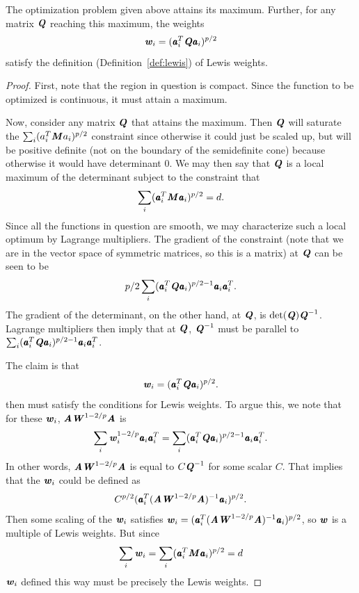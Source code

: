 \begin{lemma}
The optimization problem given above attains its maximum.
Further, for any matrix $\boldsymbol{\mathit{Q}}$ reaching this maximum, the weights
\begin{equation*}
\boldsymbol{\mathit{w}}_i = (\pmb{\mathit{a}}_i^T \boldsymbol{\mathit{Q}} \pmb{\mathit{a}}_i)^{p/2}
\end{equation*}
satisfy the definition (Definition~\ref{def:lewis}) of Lewis weights.
\end{lemma}
\begin{proof}
First, note that the region in question is compact.  Since the function to be
optimized is continuous, it must attain a maximum.

Now, consider any matrix $\boldsymbol{\mathit{Q}}$ that attains the maximum.
Then $\boldsymbol{\mathit{Q}}$ will saturate the $\sum_i (a_i^T \boldsymbol{\mathit{M}} a_i)^{p/2}$ constraint since otherwise
it could just be scaled up, but will be positive definite (not on the boundary of
the semidefinite cone) because otherwise it would have determinant 0.  We may then
say that $\boldsymbol{\mathit{Q}}$ is a local maximum of the determinant subject to the constraint that
\begin{equation*}
\sum_i (\pmb{\mathit{a}}_i^T \boldsymbol{\mathit{M}} \pmb{\mathit{a}}_i)^{p/2} = d.
\end{equation*}
Since all the functions in question are smooth, we may characterize such a local optimum
by Lagrange multipliers.  The gradient of the constraint (note that we are in the vector
space of symmetric matrices, so this is a matrix) at $\boldsymbol{\mathit{Q}}$ can be seen to be
\begin{equation*}
p/2 \sum_i (\pmb{\mathit{a}}_i^T \boldsymbol{\mathit{Q}} \pmb{\mathit{a}}_i)^{p/2 - 1} \pmb{\mathit{a}}_i \pmb{\mathit{a}}_i^T.
\end{equation*}
The gradient of the determinant, on the other hand, at $\boldsymbol{\mathit{Q}}$, is $\det(\boldsymbol{\mathit{Q}}) \boldsymbol{\mathit{Q}}^{-1}$.
Lagrange multipliers then imply that at $\boldsymbol{\mathit{Q}}$, $\boldsymbol{\mathit{Q}}^{-1}$ must be parallel to
$\sum_i (\pmb{\mathit{a}}_i^T \boldsymbol{\mathit{Q}} \pmb{\mathit{a}}_i)^{p/2 - 1} \pmb{\mathit{a}}_i \pmb{\mathit{a}}_i^T$.

The claim is that
\begin{equation*}
\boldsymbol{\mathit{w}}_i = (\pmb{\mathit{a}}_i^T \boldsymbol{\mathit{Q}} \pmb{\mathit{a}}_i)^{p/2}.
\end{equation*}
then must satisfy the conditions for Lewis weights.  To argue this, we note that
for these $\boldsymbol{\mathit{w}}_i$, $\boldsymbol{\mathit{A}} \boldsymbol{\mathit{W}}^{1 - 2/p} \boldsymbol{\mathit{A}}$ is
\begin{equation*}
\sum_i \boldsymbol{\mathit{w}}_i^{1-2/p} \pmb{\mathit{a}}_i \pmb{\mathit{a}}_i^T = \sum_i (\pmb{\mathit{a}}_i^T \boldsymbol{\mathit{Q}} \pmb{\mathit{a}}_i)^{p/2 - 1} \pmb{\mathit{a}}_i \pmb{\mathit{a}}_i^T.
\end{equation*}
In other words, $\boldsymbol{\mathit{A}} \boldsymbol{\mathit{W}}^{1 - 2/p} \boldsymbol{\mathit{A}}$ is equal to $C \boldsymbol{\mathit{Q}}^{-1}$ for some scalar $C$.
That implies that the $\boldsymbol{\mathit{w}}_i$ could be defined as
\begin{equation*}
C^{p/2} (\pmb{\mathit{a}}_i^T (\boldsymbol{\mathit{A}} \boldsymbol{\mathit{W}}^{1 - 2/p} \boldsymbol{\mathit{A}})^{-1} \pmb{\mathit{a}}_i)^{p/2}.
\end{equation*}
Then some scaling of the $\boldsymbol{\mathit{w}}_i$ satisfies
$\boldsymbol{\mathit{w}}_i = (\pmb{\mathit{a}}_i^T (\boldsymbol{\mathit{A}} \boldsymbol{\mathit{W}}^{1 - 2/p} \boldsymbol{\mathit{A}})^{-1} \pmb{\mathit{a}}_i)^{p/2}$,
so $\boldsymbol{\mathit{w}}$ is a multiple of Lewis weights. But since
\begin{equation*}
\sum_i \boldsymbol{\mathit{w}}_i = \sum_i (\pmb{\mathit{a}}_i^T \boldsymbol{\mathit{M}} \pmb{\mathit{a}}_i)^{p/2} = d
\end{equation*}
$\boldsymbol{\mathit{w}}_i$ defined this way must be precisely the Lewis weights.
\end{proof}

